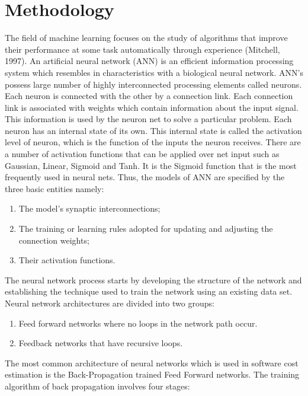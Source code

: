 \documentclass[10pt, conference, compsocconf]{IEEEtran}
\begin{document}
\section{Methodology}
The field of machine learning focuses on the study of algorithms that improve their performance at some task automatically through experience (Mitchell, 1997). An artificial neural network (ANN) is an efficient information processing system which resembles in characteristics with a biological neural network. ANN’s possess large number of highly interconnected processing elements called neurons. Each neuron is connected with the other by a connection link. Each connection link is associated with weights which contain information about the input signal. This information is used by the neuron net to solve a particular problem. Each neuron has an internal state of its own. This internal state is called the activation level of neuron, which is the function of the inputs the neuron receives. There are a number of activation functions that can be applied over net input such as Gaussian, Linear, Sigmoid and Tanh. It is the Sigmoid function that is the most frequently used in neural nets. Thus, the models of ANN are specified by the three basic entities namely:

\begin{enumerate}

\item The model’s synaptic interconnections;
\item The training or learning rules adopted for updating and adjusting the connection weights;
\item Their activation functions.

\end{enumerate}

The neural network process starts by developing the structure of the network and establishing the technique used to train the network using an existing data set. Neural network architectures are divided into two groups:

\begin{enumerate}
\item Feed forward networks where no loops in the network path occur.
\item Feedback networks that have recursive loops.

\end{enumerate}

The most common architecture of neural networks which is used in software cost estimation is the Back-Propagation trained Feed Forward networks. The training algorithm of back propagation involves four stages:
\end{document}
